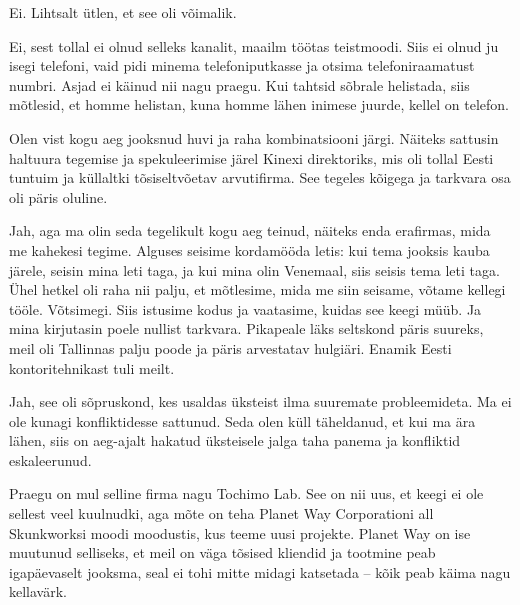 Ei. Lihtsalt ütlen, et see oli võimalik. 


Ei, sest tollal ei olnud selleks kanalit, maailm töötas teistmoodi. Siis ei olnud ju isegi 
telefoni, vaid pidi minema telefoniputkasse ja otsima telefoniraamatust numbri. 
Asjad ei käinud nii nagu praegu. Kui tahtsid sõbrale helistada, siis mõtlesid, 
et homme helistan, kuna homme lähen inimese juurde, kellel on 
telefon. 


Olen vist kogu aeg jooksnud huvi ja raha kombinatsiooni järgi. Näiteks 
sattusin haltuura tegemise ja spekuleerimise järel Kinexi 
direktoriks, mis oli tollal Eesti tuntuim ja küllaltki 
tõsiseltvõetav arvutifirma. See tegeles kõigega ja tarkvara osa oli päris oluline. 


Jah, aga ma olin seda tegelikult kogu aeg teinud, näiteks enda 
erafirmas, mida me kahekesi tegime. Alguses seisime kordamööda letis: kui tema 
jooksis kauba järele, seisin mina leti taga, ja kui mina olin Venemaal, siis seisis 
tema leti taga. Ühel hetkel oli raha nii palju, et mõtlesime, mida me siin 
seisame, võtame kellegi tööle. Võtsimegi. Siis istusime kodus ja 
vaatasime, kuidas see keegi müüb. Ja mina kirjutasin poele nullist tarkvara. Pikapeale läks
seltskond päris suureks, meil oli Tallinnas palju poode ja 
päris arvestatav hulgiäri. Enamik Eesti kontoritehnikast tuli meilt. 


Jah, see oli sõpruskond, kes usaldas üksteist ilma suuremate probleemideta. Ma ei ole kunagi konfliktidesse 
sattunud. Seda olen küll täheldanud, et kui ma ära lähen, siis on aeg-ajalt 
hakatud üksteisele jalga taha panema ja konfliktid
eskaleerunud.


Praegu on mul selline firma nagu Tochimo Lab. See on nii uus, et keegi ei ole sellest veel kuulnudki, aga mõte on teha
Planet Way Corporationi all Skunkworksi moodi moodustis, kus 
teeme uusi projekte. Planet Way on ise muutunud selliseks, et meil 
on väga tõsised kliendid ja tootmine peab igapäevaselt jooksma, seal ei tohi 
mitte midagi katsetada -- kõik peab käima nagu kellavärk. 

